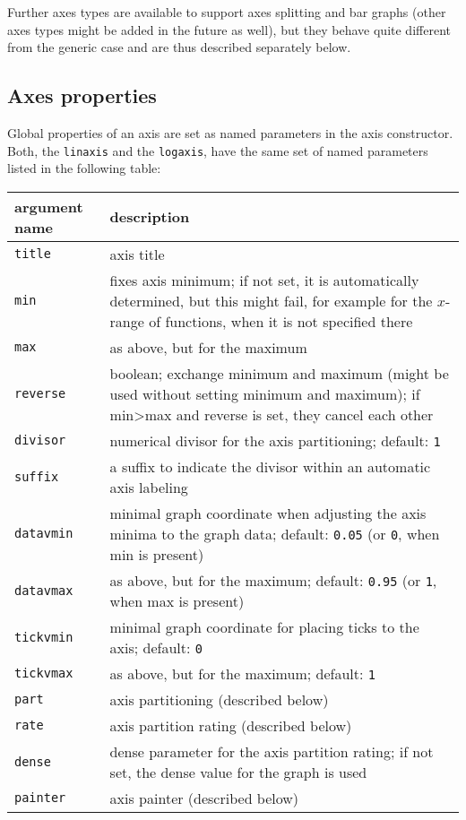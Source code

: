 Further axes types are available to support axes splitting and bar
graphs (other axes types might be added in the future as well), but
they behave quite different from the generic case and are thus
described separately below.

\subsection{Axes properties}

Global properties of an axis are set as named parameters in the axis
constructor. Both, the \verb|linaxis| and the \verb|logaxis|, have the
same set of named parameters listed in the following table:

\medskip
\begin{tabularx}{\linewidth}{l>{\raggedright\arraybackslash}X}
argument name&description\\
\hline
\texttt{title}&axis title\\
\texttt{min}&fixes axis minimum; if not set, it is automatically determined, but this might fail, for example for the $x$-range of functions, when it is not specified there\\
\texttt{max}&as above, but for the maximum\\
\texttt{reverse}&boolean; exchange minimum and maximum (might be used without setting minimum and maximum); if min>max and reverse is set, they cancel each other\\
\texttt{divisor}&numerical divisor for the axis partitioning; default: \texttt{1}\\
\texttt{suffix}&a suffix to indicate the divisor within an automatic axis labeling\\
\texttt{datavmin}&minimal graph coordinate when adjusting the axis minima to the graph data; default: \texttt{0.05} (or \texttt{0}, when min is present)\\
\texttt{datavmax}&as above, but for the maximum; default: \texttt{0.95} (or \texttt{1}, when max is present)\\
\texttt{tickvmin}&minimal graph coordinate for placing ticks to the axis; default: \texttt{0}\\
\texttt{tickvmax}&as above, but for the maximum; default: \texttt{1}\\
\texttt{part}&axis partitioning (described below)\\
\texttt{rate}&axis partition rating (described below)\\
\texttt{dense}&dense parameter for the axis partition rating; if not set, the dense value for the graph is used\\
\texttt{painter}&axis painter (described below)\\
\end{tabularx}
\medskip

